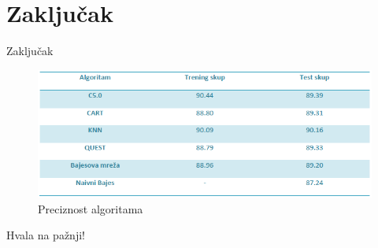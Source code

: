 \documentclass{beamer}
\begin{document}
\section{Zaključak}
\begin{frame}{Zaključak}
    \begin{figure}[h!]
                \begin{center}
                \includegraphics[scale=0.60]{zakljucak.png}
                \end{center}
                \caption{Preciznost algoritama}
      \end{figure}
\end{frame}


\begin{frame}{}
    Hvala na pažnji!
\end{frame}
\end{document}

